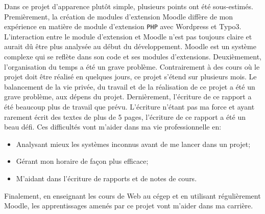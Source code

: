 ﻿\begin{conclusion}
Dans ce projet d'apparence plut\^ot simple, plusieurs points ont \'et\'e sous-estim\'es.
Premi\`erement, la cr\'eation de modules d'extension Moodle diff\`ere de mon exp\'erience en mati\`ere de module d'extension \texttt{PHP} avec Wordpress et Typo3.
L'interaction entre le module d'extension et Moodle n'est pas toujours claire et aurait d\^u \^etre plus analys\'ee au d\'ebut du d\'eveloppement.
Moodle est un syst\`eme complexe qui se refl\`ete dans son code et ses modules d'extensions.
Deuxi\`emement, l'organisation du temps a \'et\'e un grave probl\`eme.
Contrairement \`a des cours o\`u le projet doit \^etre r\'ealis\'e en quelques jours, ce projet s'\'etend sur plusieurs mois.
Le balancement de la vie priv\'ee, du travail et de la r\'ealisation de ce projet a \'et\'e un grave probl\`eme, aux d\'epens du projet.
Derni\`erement, l'\'ecriture de ce rapport a \'et\'e beaucoup plus de travail que pr\'evu.
L'\'ecriture n'\'etant pas ma force et ayant rarement \'ecrit des textes de plus de 5 pages, l'\'ecriture de ce rapport a \'et\'e un beau d\'efi.
Ces difficult\'es vont m'aider dans ma vie professionnelle en:
\begin{itemize}
  \item Analysant mieux les syst\`emes inconnus avant de me lancer dans un projet;
  \item G\'erant mon horaire de fa\c{c}on plus efficace;
  \item M'aidant dans l'\'ecriture de rapports et de notes de cours.
\end{itemize}
Finalement, en enseignant les cours de Web au c\'egep et en utilisant r\'eguli\`erement Moodle, les apprentissages amen\'es par ce projet vont m'aider dans ma carri\`ere.
\end{conclusion}